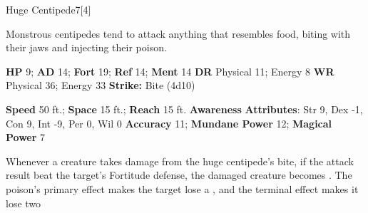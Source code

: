   \begin{monsection}{Huge Centipede}{7}[4]
    \vspace{-1em}\vspace{-1em}
    \vspace{0em}

    
    Monstrous centipedes tend to attack anything that resembles food, biting with their jaws and injecting their poison.
  

    \begin{spellcontent}
      \begin{spelltargetinginfo}
        \pari \textbf{HP} 9;
          \textbf{AD} 14;
          \textbf{Fort} 19;
          \textbf{Ref} 14;
          \textbf{Ment} 14
        \pari \textbf{DR} Physical 11; Energy 8
        \pari \textbf{WR} Physical 36; Energy 33
        \pari \textbf{Strike:}
            Bite  (4d10)
      \end{spelltargetinginfo}
    \end{spellcontent}
    \begin{monsterfooter}
      \pari \textbf{Speed} 50 ft.;
        \textbf{Space} 15 ft.;
        \textbf{Reach} 15 ft.
      \pari \textbf{Awareness} 
      \pari \textbf{Attributes}:
        Str 9, Dex -1,
        Con 9, Int -9,
        Per 0, Wil 0
      \pari \textbf{Accuracy} 11;
        \textbf{Mundane Power} 12;
      \textbf{Magical Power} 7
    \end{monsterfooter}
  \end{monsection}
    Whenever a creature takes damage from the huge centipede's bite,
      if the attack result beat the target's Fortitude defense,
      the damaged creature becomes .
    The poison's primary effect makes the target lose a , and the terminal effect makes it lose two 
  
